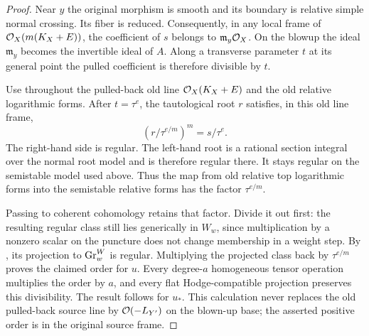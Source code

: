 \begin{proof}
Near $y$ the original morphism is smooth and its boundary is
relative simple normal crossing.  Its fiber is reduced.
Consequently, in any local frame of $\mathcal O_X(m(K_X+E))$, the
coefficient of $s$ belongs to
$\mathfrak m_y\mathcal O_X$.  On the blowup the ideal
$\mathfrak m_y$ becomes the invertible ideal of $A$.
Along a transverse parameter $t$ at its general point the
pulled coefficient is therefore divisible by $t$.

Use throughout the pulled-back old line $\mathcal O_X(K_X+E)$ and
the old relative logarithmic forms.  After $t=\tau^e$, the
tautological root $r$ satisfies, in this old line frame,
\begin{equation}\label{eq:log-input-zero-equation}
 \left(r/\tau^{e/m}\right)^m=s/\tau^e.
\end{equation}
The right-hand side is regular.  The left-hand root is a
rational section integral over the normal root model and
is therefore regular there.  It stays regular on the
semistable model used above.  Thus the map from old relative
top logarithmic forms into the semistable relative forms
has the factor $\tau^{e/m}$.

Passing to coherent cohomology retains that factor.  Divide
it out first: the resulting regular class still lies
generically in $W_w$, since multiplication by a nonzero
scalar on the puncture does not change membership in a
weight step.  By , its projection
to $\operatorname{Gr}^W_w$ is regular.  Multiplying the projected class
back by $\tau^{e/m}$ proves the claimed order for $u$.
Every degree-$a$ homogeneous tensor operation multiplies
the order by $a$, and every flat Hodge-compatible projection
preserves this divisibility.  The result follows for $u_*$.
This calculation never replaces the old pulled-back source
line by $\mathcal O(-L_{Y'})$ on the blown-up base; the asserted
positive order is in the original source frame.
\end{proof}
